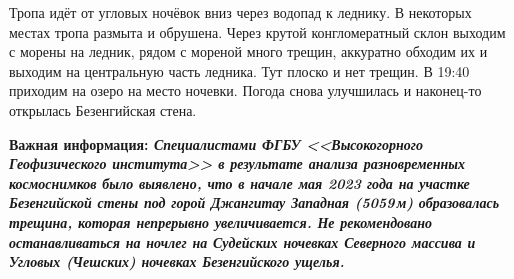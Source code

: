     Тропа идёт от угловых ночёвок вниз через водопад к леднику. В некоторых местах тропа размыта и обрушена. Через
    крутой конгломератный склон выходим с морены на ледник, рядом с мореной много трещин, аккуратно обходим их и
    выходим на центральную часть ледника. Тут плоско и нет трещин. В 19:40 приходим на озеро на место ночевки. Погода
    снова улучшилась и наконец-то открылась Безенгийская стена.

    {\bf Важная информация: \it Специалистами ФГБУ <<Высокогорного Геофизического института>> в результате анализа
    разновременных космоснимков было выявлено, что в начале мая 2023 года на участке Безенгийской стены под горой
    Джангитау Западная (5059\,м) образовалась трещина, которая непрерывно увеличивается. Не рекомендовано
    останавливаться на ночлег на Судейских ночевках Северного массива и Угловых (Чешских) ночевках Безенгийского
    ущелья.}

    \FloatBarrier
    










